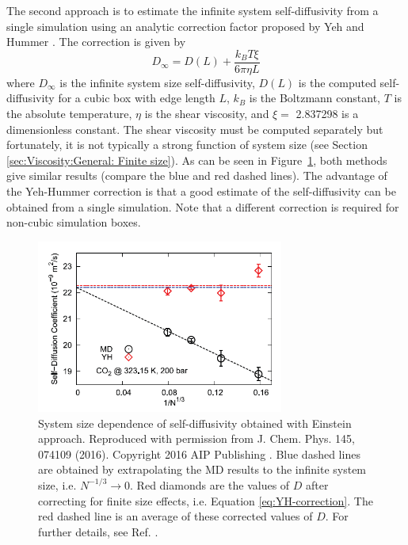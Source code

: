 \documentclass[9pt,bestpractices]{livecoms}
\begin{document}
The second approach is to estimate the infinite system self-diffusivity from a single simulation using an analytic correction factor proposed by Yeh and Hummer \cite{Yeh2004}. The correction is given by
\begin{equation}
	D_{\infty} = D(L) + \frac{k_B T \xi}{6 \pi \eta L}
	\label{eq:YH-correction}
\end{equation}
where $D_\infty$ is the infinite system size self-diffusivity, $D(L)$ is the computed self-diffusivity for a cubic box with edge length $L$, $k_B$ is the Boltzmann constant,
$T$ is the absolute temperature, $\eta$ is the shear viscosity, and $\xi =$ 2.837298 is a dimensionless constant. The shear viscosity must be computed separately but fortunately, it is not typically a strong function of system size (see Section \ref{sec:Viscosity:General: Finite size}). As can be seen in Figure~\ref{fig:MoultosFig1}, both methods give similar results (compare the blue and red dashed lines). The advantage of the Yeh-Hummer correction is that a good estimate of the self-diffusivity can be obtained from a single simulation. Note that a different correction is required for non-cubic simulation boxes.\cite{Kikugawa:2015}

\begin{figure}[htb!]
	\centering
	\includegraphics[width=3.2in]{MoultosFig1.png}
	\caption{System size dependence of self-diffusivity obtained with Einstein approach. Reproduced with permission from J. Chem. Phys. 145, 074109 (2016). Copyright 2016 AIP Publishing \cite{Moultos2016}. Blue dashed lines are obtained by extrapolating the MD results to the infinite system size, i.e. $N^{-1/3} \to 0$. Red diamonds are the values of $D$ after correcting for finite size effects, i.e. Equation \ref{eq:YH-correction}. The red dashed line is an average of these corrected values of $D$. For further details, see Ref. \cite{Moultos2016}.}
	\label{fig:MoultosFig1}
\end{figure}
\end{document}
